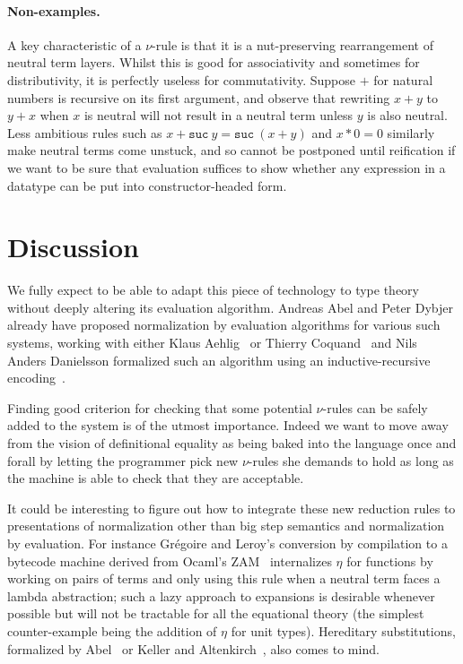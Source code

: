 \paragraph{Non-examples.} A key characteristic of a $\nu$-rule is that
it is a nut-preserving rearrangement of neutral term layers. Whilst
this is good for associativity and sometimes for distributivity, it is
perfectly useless for commutativity. Suppose $+$ for natural numbers
is recursive on its first argument, and observe that rewriting $x + y$
to $y + x$ when $x$ is neutral will not result in a neutral term
unless $y$ is also neutral. Less ambitious rules such as
$x+\mathtt{suc}\:y = \mathtt{suc}\:(x+y)$ and $x*0 = 0$ similarly make
neutral terms come unstuck, and so cannot be postponed until
reification if we want to be sure that evaluation suffices to show
whether any expression in a datatype can be put into
constructor-headed form.



\section{Discussion}

We fully expect to be able to adapt this piece of technology to type theory without
deeply altering its evaluation algorithm. Andreas Abel and Peter Dybjer already
have proposed normalization by evaluation algorithms for various such systems,
working with either Klaus Aehlig~\cite{NbeDep1} or Thierry Coquand~\cite{NbeDep2}
and Nils Anders Danielsson formalized such an algorithm using an inductive-recursive
encoding~\cite{NadNbeDep}.

Finding good criterion for checking that some potential $\nu$-rules can be safely
added to the system is of the utmost importance. Indeed we want to move away from
the vision of definitional equality as being baked into the language once and
forall by letting the programmer pick new $\nu$-rules she demands to hold as long
as the machine is able to check that they are acceptable.

It could be interesting to figure out how to integrate these new reduction rules
to presentations of normalization other than big step semantics and normalization
by evaluation. For instance Gr\'{e}goire and Leroy's conversion by compilation to a
bytecode machine derived from Ocaml's ZAM~\cite{ConvTestZAMed} internalizes $\eta$
for functions by working on pairs of terms and only using this rule when a neutral
term faces a lambda abstraction; such a lazy approach to expansions is desirable
whenever possible but will not be tractable for all the equational theory (the
simplest counter-example being the addition of $\eta$ for unit types). Hereditary
substitutions, formalized by Abel~\cite{HeredSubst1} or Keller and
Altenkirch~\cite{HeredSubst2}, also comes to mind.


